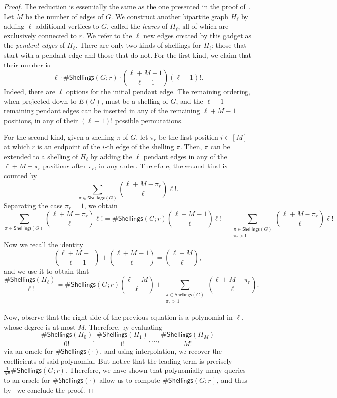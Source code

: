 \documentclass[11pt]{amsart}
\begin{document}
\begin{proof}
The reduction is essentially the same as the one presented in the proof of~. Let $M$ be the number of edges of $G$. We construct another bipartite graph $H_\ell$ by adding $\ell$ additional vertices to $G$, called the \emph{leaves} of $H_\ell$, all of which are exclusively connected to $r$. We refer to the $\ell$ new edges created by this gadget as the \emph{pendant edges} of $H_\ell$. There are only two kinds of shellings for $H_\ell$: those that start with a pendant edge and those that do not. For the first kind, we claim that their number is
    \[
    \ell \cdot \# \mathsf{Shellings}(G; r) \cdot \binom{\ell+M-1}{\ell-1} (\ell-1)!.
    \]
Indeed, there are $\ell$ options for the initial pendant edge. The remaining ordering, when projected down to $E(G)$, must be a shelling of $G$, and the $\ell-1$ remaining pendant edges can be inserted in any of the remaining $\ell+M-1$ positions, in any of their $(\ell-1)!$ possible permutations.

For the second kind, given a shelling $\pi$ of $G$, let $\pi_r$ be the first position $i \in [M]$ at which $r$ is an endpoint of the $i$-th edge of the shelling $\pi$. Then, $\pi$ can be extended to a shelling of $H_\ell$ by adding the $\ell$ pendant edges in any of the $\ell+M - \pi_r$ positions after $\pi_r$, in any order. Therefore, the second kind is counted by
    \[
    \sum_{\pi \in \mathsf{Shellings}(G)} \binom{\ell+M - \pi_r}{\ell} \ell!.
    \]
Separating the case $\pi_r = 1$, we obtain
    \[
    \sum_{\pi \in \mathsf{Shellings}(G)} \binom{\ell+M - \pi_r}{\ell} \ell! = \# \mathsf{Shellings}(G; r) \binom{\ell+M-1}{\ell} \ell!+ \sum_{\substack{\pi \in \mathsf{Shellings}(G)\\ \pi_r > 1}} \binom{\ell+M - \pi_r}{\ell} \ell!
    \]
Now we recall the identity
$$\binom{\ell+M-1}{\ell-1} +  \binom{\ell+M-1}{\ell} = \binom{\ell+M}{\ell},$$
and we use it to obtain that
    \[
    \frac{\#\mathsf{Shellings}(H_\ell)}{\ell!} = \# \mathsf{Shellings}(G; r) \binom{\ell+M}{\ell} + \sum_{\substack{\pi \in \mathsf{Shellings}(G)\\ \pi_r > 1}} \binom{\ell+M - \pi_r}{\ell}.
    \]

Now, observe that the right side of the previous equation is a polynomial in $\ell$, whose degree is at most $M$. Therefore, by evaluating 
    \[
    \frac{\#\mathsf{Shellings}(H_0)}{0!}, \frac{\#\mathsf{Shellings}(H_1)}{1!}, \dots, \frac{\#\mathsf{Shellings}(H_{M})}{M!}
    \]
    via an oracle for $\#\mathsf{Shellings}(\cdot)$, and using interpolation, we recover the coefficients of said polynomial. But notice that the leading term is precisely $\frac{1}{M!}\#\mathsf{Shellings}(G; r)$. Therefore, we have shown that polynomially many queries to an oracle for $\#\mathsf{Shellings}(\cdot)$ allow us to compute $\#\mathsf{Shellings}(G; r)$, and thus by~ we conclude the proof.
\end{proof}
\end{document}
